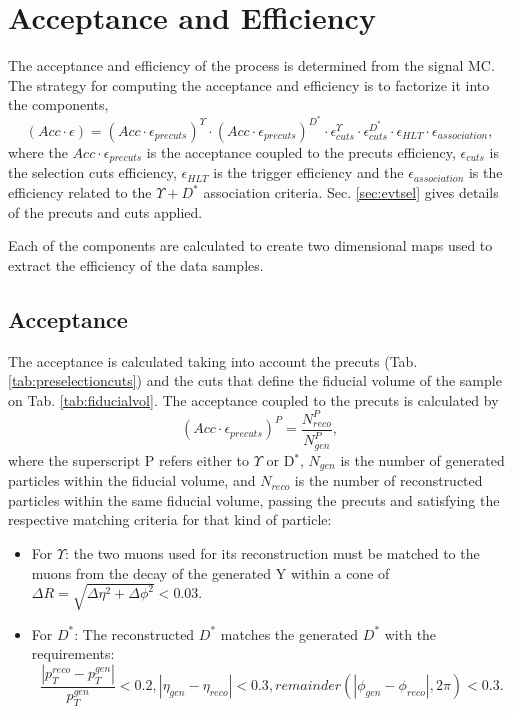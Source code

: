 \section{Acceptance and Efficiency}

The acceptance and efficiency of the process is determined from the signal MC. The strategy for computing the acceptance and efficiency is to factorize it into the components,
\begin{equation}
  (Acc\cdot\epsilon) = (Acc\cdot\epsilon_{precuts})^\Upsilon \cdot 
  (Acc\cdot\epsilon_{precuts})^{D^*} \cdot \epsilon_{cuts}^\Upsilon \cdot 
  \epsilon_{cuts}^{D^*} \cdot \epsilon_{HLT} \cdot \epsilon_{association},
\end{equation}
where the $Acc\cdot\epsilon_{precuts}$ is the acceptance coupled to the precuts efficiency, $\epsilon_{cuts}$ is the selection cuts efficiency, $\epsilon_{HLT}$ is the trigger efficiency and the $\epsilon_{association}$ is the efficiency related to the $\Upsilon+D^*$ association criteria. Sec. \ref{sec:evtsel} gives details of the precuts and cuts applied.

Each of the components are calculated to create two dimensional maps used to extract the efficiency of the data samples.

\subsection{Acceptance}

The acceptance is calculated taking into account the precuts (Tab. \ref{tab:preselectioncuts}) and the cuts that define the fiducial volume of the sample on Tab. \ref{tab:fiducialvol}. The acceptance coupled to the precuts is calculated by
\begin{equation}
    (Acc \cdot \epsilon_{precuts})^P = \frac{N_{reco}^P}{N_{gen}^P},
\end{equation}
where the superscript P refers either to $\Upsilon$ or D$^*$, $N_{gen}$ is the number of generated particles within the fiducial volume, and $N_{reco}$ is the number of reconstructed particles within the same fiducial volume, passing the precuts and satisfying the respective matching criteria for that kind of particle:
\begin{itemize}
  \item For $\Upsilon$: the two muons used for its reconstruction must be matched to the muons from the decay of the generated Y within a cone of $\Delta R = \sqrt{\Delta \eta^2 + \Delta \phi^2} < 0.03$.
  \item For $D^*$: The reconstructed $D^*$ matches the generated $D^*$ with the requirements:
  $$\frac{|p_T^{reco} - p_T^{gen}|}{p_T^{gen}} < 0.2, |\eta_{gen} - \eta_{reco}|
  < 0.3, remainder(|\phi_{gen} - \phi_{reco}|, 2\pi) < 0.3.$$
\end{itemize}

